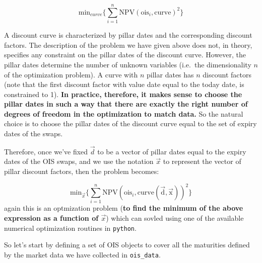 \[\mathrm{min}_{curve} \Big\{\sum_{i=1}^{n}\mathrm{NPV}(\mathrm{ois}_i, \mathrm{curve})^2\Big\}\]

A discount curve is characterized by pillar dates and the corresponding discount factors. The description of the problem we have given above does not, in theory, specifies any constraint on the pillar dates of the discount curve. However, the pillar dates determine the number of unknown variables (i.e.~the dimensionality \(n\) of the optimization problem). A curve with \(n\) pillar dates has \(n\) discount factors (note that the first discount factor with value date equal to the today date, is constrained to 1). \textbf{In practice, therefore, it makes sense to choose the pillar dates in such a way that there are exactly the right number of degrees of freedom in the optimization to match data.} So the natural choice is to choose the pillar dates of the discount curve equal to the set of expiry dates of the swaps.

Therefore, once we've fixed \(\vec{d}\) to be a vector of pillar dates equal to the expiry dates of the OIS swaps, and we use the notation \(\vec{x}\) to represent the vector of pillar discount factors, then the problem becomes:

\[\mathrm{min}_{\vec{x}} \Big\{\sum_{i=1}^{n}\mathrm{NPV}(\mathrm{ois}_i, \mathrm{curve(\vec{d}, \vec{x})})^2\Big\}\]
again this is an optmization problem (\textbf{to find the minimum of the above expression as a function of \(\vec{x}\)}) which can sovled using one of the available numerical optimization routines in \texttt{python}.

So let's start by defining a set of OIS objects to cover all the maturities defined by the market data we have collected in \texttt{ois\_data}.

